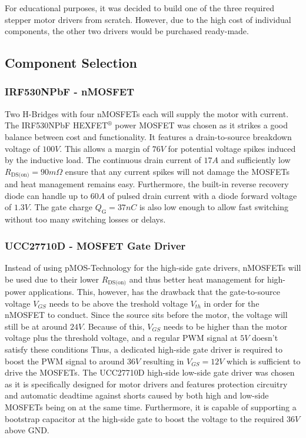 For educational purposes, it was decided to build one of the three required stepper motor drivers from scratch.
However, due to the high cost of individual components, the other two drivers would be purchased ready-made.

\subsection{Component Selection}
\subsubsection{IRF530NPbF - nMOSFET}
Two H-Bridges with four nMOSFETs each will supply the motor with current.
The IRF530NPbF HEXFET$^\circledR$ power MOSFET was chosen as it strikes a good balance between cost and functionality.
It features a drain-to-source breakdown voltage of $100V$.
This allows a margin of $76V$ for potential voltage spikes induced by the inductive load.
The continuous drain current of $17A$ and sufficiently low $R_{\text{DS(on)}}=90m\Omega$ ensure that any current spikes will not damage the MOSFETs and heat management remains easy.
Furthermore, the built-in reverse recovery diode can handle up to $60A$ of pulsed drain current with a diode forward voltage of $1.3V$.
The gate charge $Q_\text{G}=37nC$ is also low enough to allow fast switching without too many switching losses or delays.

\subsubsection{UCC27710D - MOSFET Gate Driver}
Instead of using pMOS-Technology for the high-side gate drivers, nMOSFETs will be used due to their lower $R_{\text{DS(on)}}$ and thus better heat management for high-power applications.
This, however, has the drawback that the gate-to-source voltage $V_{GS}$ needs to be above the treshold voltage $V_{th}$ in order for the nMOSFET to conduct.
Since the source sits before the motor, the voltage will still be at around $24V$.
Because of this, $V_{GS}$ needs to be higher than the motor voltage plus the threshold voltage, and a regular PWM signal at $5V$ doesn't satisfy these conditions
Thus, a dedicated high-side gate driver is required to boost the PWM signal to around $36V$ resulting in $V_{GS}=12V$ which is sufficient to drive the MOSFETs.
The UCC27710D high-side low-side gate driver was chosen as it is specifically designed for motor drivers and features protection circuitry and automatic deadtime against shorts caused by both high and low-side MOSFETs being on at the same time.
Furthermore, it is capable of supporting a bootstrap capacitor at the high-side gate to boost the voltage to the required $36V$ above GND.

